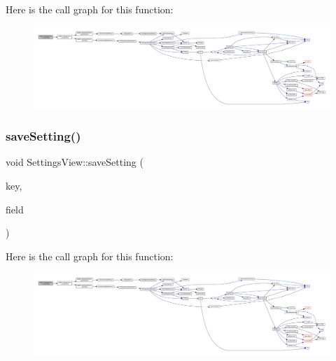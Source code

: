 Here is the call graph for this function\+:
\nopagebreak
\begin{figure}[H]
\begin{center}
\leavevmode
\includegraphics[width=350pt]{class_q_g_b_a_1_1_settings_view_afaeb044782f267409f0ef9c9c107cf1c_cgraph}
\end{center}
\end{figure}
\mbox{\label{class_q_g_b_a_1_1_settings_view_a8f5a129ead967dc31d2a37b3efeb5ce5}} 
\subsubsection{\texorpdfstring{save\+Setting()}{saveSetting()}\hspace{0.1cm}{\footnotesize\ttfamily [3/7]}}
{\footnotesize\ttfamily void Settings\+View\+::save\+Setting (\begin{DoxyParamCaption}\item[{const char $\ast$}]{key,  }\item[{const Q\+Double\+Spin\+Box $\ast$}]{field }\end{DoxyParamCaption})\hspace{0.3cm}{\ttfamily [private]}}

Here is the call graph for this function\+:
\nopagebreak
\begin{figure}[H]
\begin{center}
\leavevmode
\includegraphics[width=350pt]{class_q_g_b_a_1_1_settings_view_a8f5a129ead967dc31d2a37b3efeb5ce5_cgraph}
\end{center}
\end{figure}
\mbox{\label{class_q_g_b_a_1_1_settings_view_ab3dd47756c36b0dce85413846ed938ba}} 
